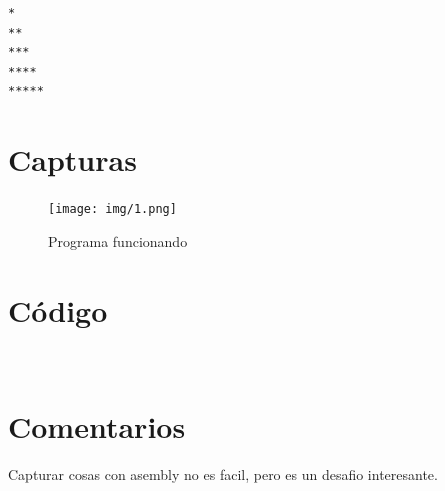 \documentclass[12pt]{article}
\begin{document}
\begin{verbatim}
*
**
***
****
*****
\end{verbatim}




\section*{Capturas}
\label{sec:orga2968c0}
\begin{figure}[htbp]
\centering
\texttt{[image: img/1.png]}
\caption{Programa funcionando}
\end{figure}

\section*{Código}
\label{sec:orgf3426a7}
\\ 

\section*{Comentarios}
\label{sec:org185f25b}
Capturar cosas con asembly no es facil, pero es un desafio interesante.
\end{document}
